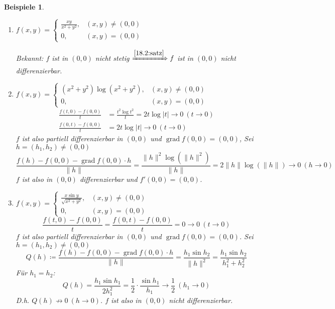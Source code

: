 \documentclass[12pt]{extreport} %
\theoremstyle{named}
\theoremstyle{nnamed}
\theoremstyle{itshape}
\theoremstyle{normal}
\newtheorem*{beispiele}{Beispiele}
\begin{document}
\begin{beispiele} ~\
	\begin{enumerate}
		\item $f(x, y) = \begin{cases} \frac{xy}{x^{2} + y^{2}}, & (x, y) \neq (0, 0) \\ 0, & (x, y) = (0, 0) \end{cases}$
		
			\bigskip
			
			Bekannt: $f$ ist in $(0, 0)$ nicht stetig $\xRightarrow[]{\ref{18.2:satz}} f$ ist in $(0, 0)$ nicht differenzierbar.
		\item $f(x, y) = \begin{cases} \left( x^{2} + y^{2} \right) \log \left( x^{2} + y^{2} \right), & (x, y) \neq (0, 0) \\ 0, & (x, y) = (0, 0) \end{cases}$
			\begin{align*}
				\frac{f(t, 0) - f(0, 0)}{t} & = \frac{t^{2} \log t^{2}}{t} = 2 t \log |t| \longrightarrow 0 ~(t \rightarrow 0) \\
				\frac{f(0, t) - f(0, 0)}{t} & = 2 t \log |t| \longrightarrow 0 ~(t \rightarrow 0)
			\end{align*}
			$f$ ist also partiell differenzierbar in $(0, 0)$ und $\operatorname{grad} f(0, 0) = (0, 0)$, Sei $h = (h_{1}, h_{2}) \neq (0, 0)$
			$$ \frac{f(h) - f(0, 0) - \operatorname{grad} f(0, 0) \cdot h}{\| h \|} = \frac{\|h\|^{2} \log \left( \|h\|^{2} \right)}{\|h\|} = 2 \|h\| \log \left( \|h\| \right) \longrightarrow 0 ~ (h \rightarrow 0) $$
			$f$ ist also in $(0, 0)$ differenzierbar und $f'(0, 0) = (0, 0)$.
		\item $f(x, y) = \begin{cases} \frac{x \sin y}{\sqrt{x^{2} + y^{2}}}, & (x, y) \neq (0, 0) \\ 0, & (x, y) = (0, 0) \end{cases}$
			$$ \frac{f(t, 0) - f(0, 0)}{t} = \frac{f(0, t) - f(0, 0)}{t} = 0 \longrightarrow 0 ~ (t \rightarrow 0) $$
			$f$ ist also partiell differenzierbar in $(0, 0)$ und $\operatorname{grad} f(0,0) = (0, 0)$. Sei $h = (h_{1}, h_{2}) \neq (0, 0)$
			$$ Q(h) \coloneqq \frac{f(h) - f(0, 0) - \operatorname{grad}f(0, 0) \cdot h}{\| h \|} = \frac{h_{1} \sin h_{2}}{\|h\|^{2}} = \frac{h_{1} \sin h_{2}}{h_{1}^{2} + h_{2}^{2}} $$
			Für $h_{1} = h_{2}$: 
			$$ Q(h) = \frac{h_{1} \sin h_{1}}{2 h_{1}^{2}} = \frac{1}{2} \cdot \frac{\sin h_{1}}{h_{1}} \longrightarrow \frac{1}{2} ~ (h_{1} \rightarrow 0) $$
			D.h. $Q(h) \not\rightarrow 0 ~(h \rightarrow 0)$. $f$ ist also in $(0, 0)$ nicht differenzierbar. %
	\end{enumerate}	
\end{beispiele}
\end{document}
